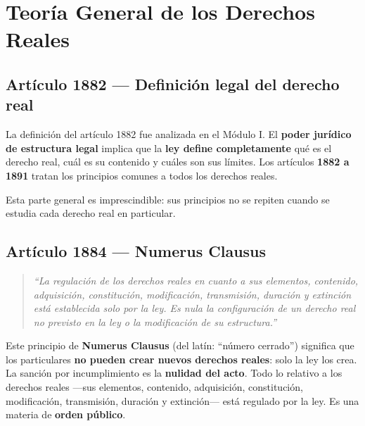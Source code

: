 \documentclass[12pt,oneside]{book}
\begin{document}
\chapter[Teor\'ia General de los Derechos Reales]{Teor\'ia General de los Derechos Reales}

\section{Art\'iculo 1882 --- Definici\'on legal del derecho real}

La definici\'on del art\'iculo 1882 fue analizada en el M\'odulo I. El \textbf{poder jur\'idico de estructura legal} implica que la \textbf{ley define completamente} qu\'e es el derecho real, cu\'al es su contenido y cu\'ales son sus l\'imites. Los art\'iculos \textbf{1882 a 1891} tratan los principios comunes a todos los derechos reales.

\begin{important}
Esta parte general es imprescindible: sus principios no se repiten cuando se estudia cada derecho real en particular.
\end{important}

\section{Art\'iculo 1884 --- Numerus Clausus}

\begin{quote}
\textit{``La regulaci\'on de los derechos reales en cuanto a sus elementos, contenido, adquisici\'on, constituci\'on, modificaci\'on, transmisi\'on, duraci\'on y extinci\'on est\'a establecida solo por la ley. Es nula la configuraci\'on de un derecho real no previsto en la ley o la modificaci\'on de su estructura.''}
\end{quote}

Este principio de \textbf{Numerus Clausus} (del lat\'in: ``n\'umero cerrado'') significa que los particulares \textbf{no pueden crear nuevos derechos reales}: solo la ley los crea. La sanci\'on por incumplimiento es la \textbf{nulidad del acto}. Todo lo relativo a los derechos reales ---sus elementos, contenido, adquisici\'on, constituci\'on, modificaci\'on, transmisi\'on, duraci\'on y extinci\'on--- est\'a regulado por la ley. Es una materia de \textbf{orden p\'ublico}.
\end{document}
